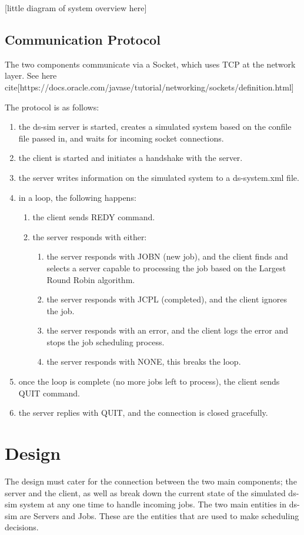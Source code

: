 \documentclass[a4paper]{article}
\begin{document}
[little diagram of system overview here]

\subsection{Communication Protocol}
The two components communicate via a Socket, which uses TCP at the network layer. See here \TODO cite[https://docs.oracle.com/javase/tutorial/networking/sockets/definition.html]

The protocol is as follows:
\begin{enumerate}
  \item the ds-sim server is started, creates a simulated system based on the confile file passed in, and waits for incoming socket connections.
  \item the client is started and initiates a handshake with the server.
  \item the server writes information on the simulated system to a ds-system.xml file.
  \item in a loop, the following happens:
  \begin{enumerate}
      \item the client sends REDY command.
      \item the server responds with either:
      \begin{enumerate}
          \item the server responds with JOBN (new job), and the client finds and selects a server capable to processing the job based on the Largest Round Robin algorithm.
          \item the server responds with JCPL (completed), and the client ignores the job.
          \item the server responds with an error, and the client logs the error and stops the job scheduling process.
          \item the server responds with NONE, this breaks the loop.
      \end{enumerate}
  \end{enumerate}
  \item once the loop is complete (no more jobs left to process), the client sends QUIT command.
  \item the server replies with QUIT, and the connection is closed gracefully.
\end{enumerate}


\section{Design}
\label{sec:section3}
The design must cater for the connection between the two main components; the server and the client, as well as break down the current state of the simulated ds-sim system at any one time to handle incoming jobs. The two main entities in ds-sim are Servers and Jobs. These are the entities that are used to make scheduling decisions.
\end{document}
